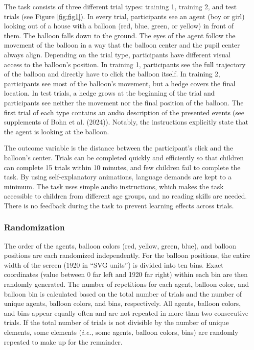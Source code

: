 \documentclass[
  man,floatsintext]{apa7}
\begin{document}
The task consists of three different trial types: training 1, training 2, and test trials (see Figure \ref{fig:fig1}).
In every trial, participants see an agent (boy or girl) looking out of a house with a balloon (red, blue, green, or yellow) in front of them.
The balloon falls down to the ground. The eyes of the agent follow the movement of the balloon in a way that the balloon center and the pupil center always align.
Depending on the trial type, participants have different visual access to the balloon's position.
In training 1, participants see the full trajectory of the balloon and directly have to click the balloon itself.
In training 2, participants see most of the balloon's movement, but a hedge covers the final location.
In test trials, a hedge grows at the beginning of the trial and participants see neither the movement nor the final position of the balloon.
The first trial of each type contains an audio description of the presented events (see supplements of Bohn et al. (2024)).
Notably, the instructions explicitly state that the agent is looking at the balloon.

The outcome variable is the distance between the participant's click and the balloon's center.
Trials can be completed quickly and efficiently so that children can complete 15 trials within 10 minutes, and few children fail to complete the task.
By using self-explanatory animations, language demands are kept to a minimum.
The task uses simple audio instructions, which makes the task accessible to children from different age groups, and no reading skills are needed.
There is no feedback during the task to prevent learning effects across trials.

\subsubsection{Randomization}\label{randomization}

The order of the agents, balloon colors (red, yellow, green, blue), and balloon positions are each randomized independently.
For the balloon positions, the entire width of the screen (1920 in ``SVG units'') is divided into ten bins.
Exact coordinates (value between 0 far left and 1920 far right) within each bin are then randomly generated.
The number of repetitions for each agent, balloon color, and balloon bin is calculated based on the total number of trials and the number of unique agents, balloon colors, and bins, respectively.
All agents, balloon colors, and bins appear equally often and are not repeated in more than two consecutive trials.
If the total number of trials is not divisible by the number of unique elements, some elements (\emph{i.e.,} some agents, balloon colors, bins) are randomly repeated to make up for the remainder.
\end{document}

